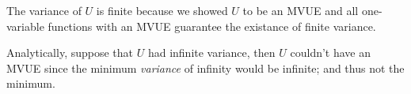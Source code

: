 The variance of $U$ is finite because we showed $U$ to be an MVUE and all one-variable functions with an MVUE guarantee the existance of finite variance. 

\nl Analytically, suppose that $U$ had infinite variance, then $U$ couldn't have an MVUE since the minimum \textit{variance} of infinity would be infinite; and thus not the minimum.